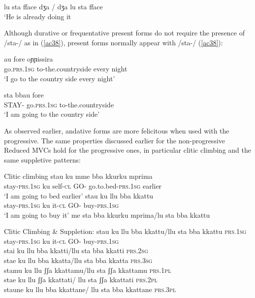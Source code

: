 \documentclass[output=paper]{langscibook}
\begin{document}
\ea\label{ac37}
    \ex \label{ac37b}lu sta fface dʒa / dʒa lu sta fface\\
     ‘He is already doing it
    \z
\z

Although durative or frequentative present forms do not require the presence of /sta-/ as in (\ref{ac38}), present forms normally appear with /sta-/ (\ref{ac38}):

\ea \label{ac38}\gll  au        fore         oɲɲissira\\
   go.\textsc{prs}.\textsc{1sg}  to-the.countryside every night\\
 \glt  ‘I go to the country side every night’
\z

\ea \label{ac39}\gll sta    bbau       fore\\
   STAY- go.\textsc{prs}.\textsc{1sg}  to-the.countryside \\
\glt   ‘I am going to the country side’
\z

As observed earlier, andative forms are more felicitous when used with the progressive. The same properties discussed earlier for the non-progressive Reduced MVCs hold for the progressive ones, in particular clitic climbing and the same suppletive patterns:

\ea \label{ac40}Clitic climbing 
    \ea \label{ac40a}
        \ea \gll stau       ku  mme   bba  kkurku      mprima\\
      stay-\textsc{prs}.\textsc{1sg} ku self-\textsc{cl}  GO- go.to.bed-\textsc{prs}.\textsc{1sg} earlier\\
      \glt ‘I am going to bed earlier’
        \ex \gll stau       ku   llu   bba   kkattu\\
      stay-\textsc{prs}.\textsc{1sg}  ku   it-\textsc{cl}  GO-  buy-\textsc{prs}.\textsc{1sg}\\
      \glt ‘I am going to buy it’
        \z
    \ex \label{ac40b}me sta bba kkurku mprima/lu sta bba kkattu
    \z
\z

\ea \label{ac41}Clitic Climbing \& Suppletion:
    \ea \label{ac41a}\gll stau    ku     llu   bba  kkattu/llu sta bba kkattu \hfill \textsc{prs}.\textsc{1sg}\\
    stay-\textsc{prs}.\textsc{1sg} ku  it-\textsc{cl}  GO-  buy-\textsc{prs}.\textsc{1sg}\\
    \glt stai ku llu bba kkatti/llu sta bba kkatti  \hfill     \textsc{prs}.\textsc{2sg}\\
    stae ku llu bba kkatta/llu sta bba kkatta   \hfill    \textsc{prs}.\textsc{3sg}\\
    stamu ku llu ʃʃa kkattamu/llu sta ʃʃa kkattamu \hfill  \textsc{prs}.\textsc{1pl}\\
    stae ku llu ʃʃa kkattati/ llu sta ʃʃa kkattati  \hfill    \textsc{prs}.\textsc{2pl}\\
    staune ku llu bba kkattane/ llu sta bba kkattane \hfill \textsc{prs}.\textsc{3pl}\\
    \z
\z
\end{document}
